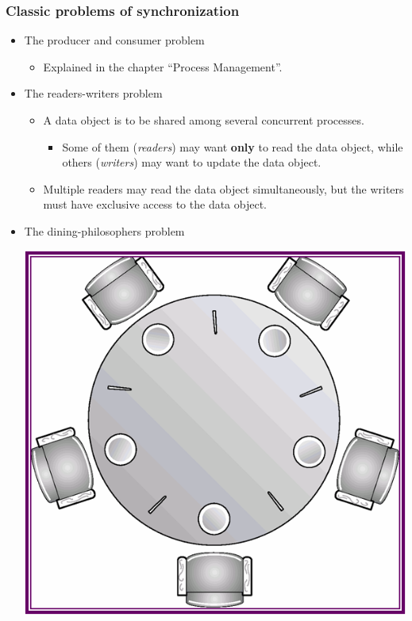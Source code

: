 \documentclass[CJKutf8,xcolor=pdftex,dvipsnames,table]{beamer}
\begin{document}
\begin{CJK*}{UTF8}{song}
  \begin{frame}
  \frametitle{Classic problems of synchronization} \pause
  \begin{itemize}
  \item{The producer and consumer problem} \pause
    \begin{itemize}
    \item{Explained in the chapter ``Process Management''.} \pause
    \end{itemize}
  \item{The readers-writers problem} \pause
    \begin{itemize}
    \item{A data object is to be shared among several concurrent processes.} \pause
      \begin{itemize}
      \item{Some of them (\emph{readers}) may want \textbf{only} to read the data object, \pause while others (\emph{writers}) may want to update the data object.} \pause
      \end{itemize}
    \item{Multiple readers may read the data object simultaneously, but the writers must have exclusive access to the data object.} \pause
    \end{itemize}
  \item{The dining-philosophers problem} \pause
    \begin{center}
    \includegraphics[scale=0.4]{v6f7-16}
    \end{center}
  \end{itemize}
  \end{frame}


\end{CJK*}
\end{document}
